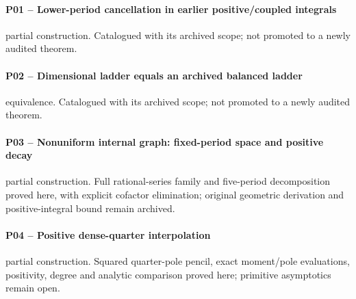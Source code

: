 \paragraph{P01 -- Lower-period cancellation in earlier positive/coupled integrals}\label{record-P01}
partial construction. Catalogued with its archived scope; not promoted to a newly audited theorem.
\par\smallskip{}\par
\paragraph{P02 -- Dimensional ladder equals an archived balanced ladder}\label{record-P02}
equivalence. Catalogued with its archived scope; not promoted to a newly audited theorem.
\par\smallskip{}\par
\paragraph{P03 -- Nonuniform internal graph: fixed-period space and positive decay}\label{record-P03}
partial construction. Full rational-series family and five-period decomposition proved here, with explicit cofactor elimination; original geometric derivation and positive-integral bound remain archived.
\par\smallskip{}\par
\paragraph{P04 -- Positive dense-quarter interpolation}\label{record-P04}
partial construction. Squared quarter-pole pencil, exact moment/pole evaluations, positivity, degree and analytic comparison proved here; primitive asymptotics remain open.
\par\smallskip{}\par
